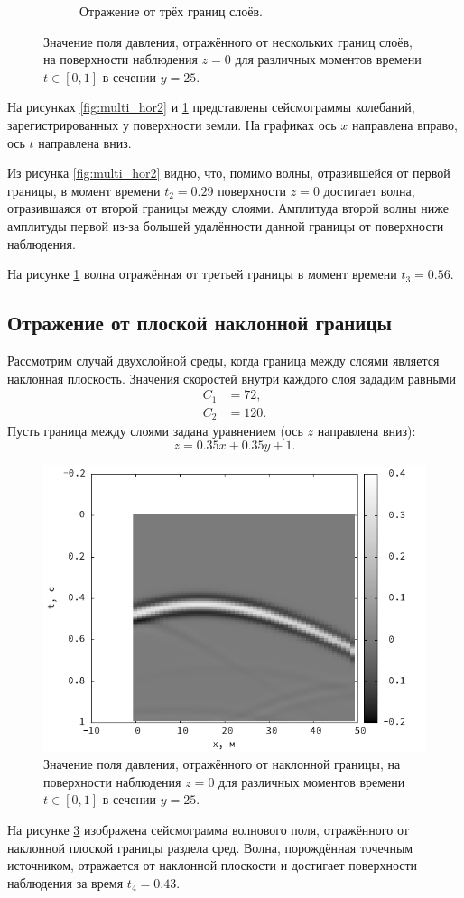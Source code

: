 \documentclass[a4paper, fontsize=14pt]{article}
\begin{document}
\begin{figure}[H]
\begin{subfigure}{.5\textwidth}
		\caption{Отражение от трёх границ слоёв.}
		\label{fig:multi_hor3}
	\end{subfigure}
	\caption{Значение поля давления, отражённого от нескольких границ слоёв, на поверхности наблюдения $z = 0$ для различных моментов времени $t\in [0,1]$ в сечении $y=25$.}
	\label{fig:multi_hor}
\end{figure}

	На рисунках \ref{fig:multi_hor2} и \ref{fig:multi_hor3} представлены сейсмограммы колебаний, зарегистрированных у поверхности земли. На графиках ось $x$ направлена вправо, ось $t$ направлена  вниз. 
	
	Из рисунка \ref{fig:multi_hor2} видно, что, помимо волны, отразившейся от первой границы, в момент времени $t_2 = 0.29$ поверхности $z=0$  достигает волна, отразившаяся от второй границы между слоями. Амплитуда второй волны ниже амплитуды первой из-за большей удалённости данной границы от поверхности наблюдения. 
	
	На рисунке \ref{fig:multi_hor3} волна отражённая от третьей границы в момент времени $t_3 = 0.56$.
	
	\subsection{Отражение от плоской наклонной границы}
		
Рассмотрим случай двухслойной среды, когда граница между слоями является наклонная плоскость. Значения скоростей внутри каждого слоя зададим равными 
\begin{align*}
	C_1 &= 72, \\
	C_2 &= 120.
\end{align*}
	Пусть граница между слоями задана уравнением (ось $z$ направлена вниз):
	\begin{equation}
		z = 0.35 x + 0.35 y + 1.
	\end{equation}
	\begin{figure}[H]
		\centering
		\includegraphics[width=.7\textwidth]{smooth_tilted_seism.png}
		\caption{Значение поля давления, отражённого от наклонной границы, на поверхности наблюдения $z = 0$ для различных моментов времени $t\in [0,1]$ в сечении $y=25$.}
		\label{fig:tilt}
	\end{figure}
	На рисунке \ref{fig:tilt} изображена сейсмограмма волнового поля, отражённого от наклонной плоской границы раздела сред. Волна, порождённая точечным источником, отражается от наклонной плоскости и достигает поверхности наблюдения за время $t_4 = 0.43$. %
	
\end{document}
